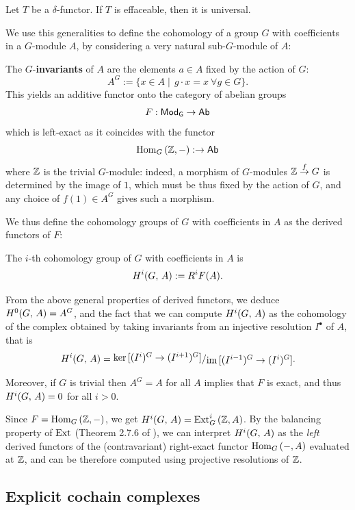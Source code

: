 \documentclass[a4paper, oneside]{memoir}
\begin{document}
\begin{proposition}\label{prop:Effaceable}
	Let $T$ be a $\delta$-functor. If $T$ is effaceable, then it is universal.
\end{proposition}

We use this generalities to define the cohomology of a group $G$ with coefficients in a $G$-module $A$, by considering a very natural sub-$G$-module of $A$:

\begin{definition}
	The $G$-\textbf{invariants} of $A$ are the elements $a \in A$ fixed by the action of $G$:
	\[
		A^G:=\{x\in A\mid\, g\cdot x=x ~ \forall g\in G\}.
	\]
	This yields an additive functor onto the category of abelian groups
	\[
		F:\mathsf{Mod}_\mathsf{G}\to\mathsf{Ab}
	\]
	which is left-exact as it coincides with the functor
	\[
		\operatorname{Hom}_G{(\mathbb{Z},-)}:\to\mathsf{Ab}
	\]
	where $\mathbb{Z}$ is the trivial $G$-module: indeed, a morphism of $G$-modules $\mathbb{Z}\overset{f}\to G$ is determined by the image of $1$, which must be thus fixed by the action of $G$, and any choice of $f(1)\in A^G$ gives such a morphism.
\end{definition}

We thus define the cohomology groups of $G$ with coefficients in $A$ as the derived functors of $F$:

\begin{definition}
	The $i$-th cohomology group of $G$ with coefficients in $A$ is
	\[
		H^{i}( G, \, A ):=R^iF(A).
	\]
\end{definition}
From the above general properties of derived functors, we deduce $H^{0}( G, \, A )=A^G$, and the fact that we can compute $H^{i}( G, \, A )$ as the cohomology of the complex obtained by taking  invariants from an injective resolution $I^\bullet$ of $A$, that is
\[
	\H{i}{G}{A}=\ssfrac{\ker{[(I^i)^G\to (I^{i+1})^G]}}{\Im{[(I^{i-1})^G\to (I^i)^G]}}.
\]

\noindent Moreover, if $G$ is trivial then $A^G=A$ for all $A$ implies that $F$ is exact, and thus $H^{i}( G, \, A )=0$ for all $i>0$.

\begin{remark}
	Since $F=\operatorname{Hom}_G{(\mathbb{Z},-)}$, we get $H^{i}( G, \, A )=\operatorname{Ext}^i_G{(\mathbb{Z},A)}$. By the balancing property of $\operatorname{Ext}$ (Theorem 2.7.6 of \cite{Weibel}), we can interpret $H^{i}( G, \, A )$ as the \textit{left} derived functors of the (contravariant) right-exact functor $\operatorname{Hom}_G{(-,A)}$ evaluated at $\mathbb{Z}$, and can be therefore computed using projective resolutions of $\mathbb{Z}$.
\end{remark}

\subsection{Explicit cochain complexes}
\end{document}
